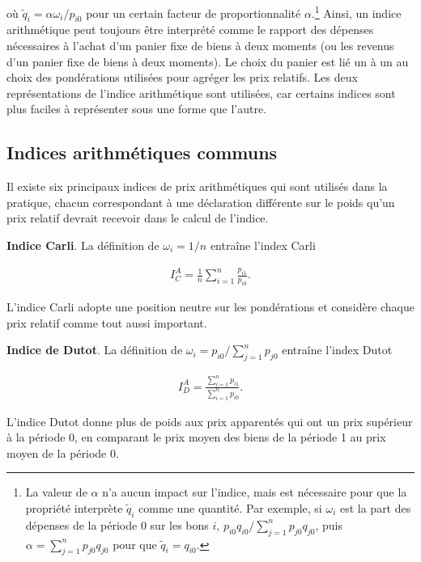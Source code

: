 \documentclass[]{article}
\begin{document}
où \(\tilde{q}_{i} = \alpha \omega_{i} / p_{i0}\) pour un certain facteur de proportionnalité \(\alpha\).\footnote{La valeur de \(\alpha\) n'a aucun impact sur l'indice, mais est nécessaire pour que la propriété interprète \(\tilde{q}_{i}\) comme une quantité. Par exemple, si \(\omega_{i}\) est la part des dépenses de la période 0 sur les bons \(i\), \(p_{i0} q_{i0} / \sum_{j = 1}^{n} p_{j0} q_{j0}\), puis \(\alpha = \sum_{j = 1}^{n} p_{j0} q_{j0}\) pour que \(\tilde{q}_{i} = q_{i0}\).} Ainsi, un indice arithmétique peut toujours être interprété comme le rapport des dépenses nécessaires à l'achat d'un panier fixe de biens à deux moments (ou les revenus d'un panier fixe de biens à deux moments). Le choix du panier est lié un à un au choix des pondérations utilisées pour agréger les prix relatifs. Les deux représentations de l'indice arithmétique sont utilisées, car certains indices sont plus faciles à représenter sous une forme que l'autre.

\hypertarget{indices-arithmuxe9tiques-communs}{%
\subsection{Indices arithmétiques communs}\label{indices-arithmuxe9tiques-communs}}

Il existe six principaux indices de prix arithmétiques qui sont utilisés dans la pratique, chacun correspondant à une déclaration différente sur le poids qu'un prix relatif devrait recevoir dans le calcul de l'indice.

\textbf{Indice Carli}. La définition de \(\omega_{i} = 1 / n\) entraîne l'index Carli

\begin{align*}
I^{A}_{C} = \frac{1}{n} \sum_{i = 1}^{n} \frac{p_{i1}}{p_{i0}}.
\end{align*}

L'indice Carli adopte une position neutre sur les pondérations et considère chaque prix relatif comme tout aussi important.

\textbf{Indice de Dutot}. La définition de \(\omega_{i} = p_{i0} / \sum_{j = 1}^{n} p_{j0}\) entraîne l'index Dutot

\begin{align*}
I^{A}_D = \frac{\sum_{i = 1}^{n} p_{i1}}{\sum_{i = 1}^{n} p_{i0}}.
\end{align*}

L'indice Dutot donne plus de poids aux prix apparentés qui ont un prix supérieur à la période 0, en comparant le prix moyen des biens de la période 1 au prix moyen de la période 0.
\end{document}
